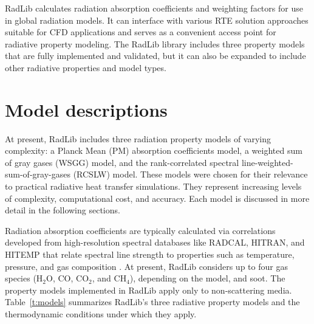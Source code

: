 \documentclass[preprint,12pt]{elsarticle}
\begin{document}
RadLib calculates radiation absorption coefficients and weighting factors for use in global radiation models. It can interface with various RTE solution approaches suitable for CFD applications and serves as a convenient access point for radiative property modeling. The RadLib library includes three property models that are fully implemented and validated, but it can also be expanded to include other radiative properties and model types.


\section{Model descriptions} \label{s:models}

At present, RadLib includes three radiation property models of varying complexity: a Planck Mean (PM) absorption coefficients model, a weighted sum of gray gases (WSGG) model, and the rank-correlated spectral line-weighted-sum-of-gray-gases (RCSLW) model.
These models were chosen for their relevance to practical radiative heat transfer simulations. They represent increasing levels of complexity, computational cost, and accuracy. Each model is discussed in more detail in the following sections.

Radiation absorption coefficients are typically calculated via correlations developed from high-resolution spectral databases like RADCAL, HITRAN, and HITEMP \citep{Grosshandler_1993,Rothman_2010} that relate spectral line strength to properties such as temperature, pressure, and gas composition \citep{Zhang_2002b}. At present, RadLib considers up to four gas species (H$_2$O, CO, CO$_2$, and CH$_4$), depending on the model, and soot. The property models implemented in RadLib apply only to non-scattering media. Table~\ref{t:models} summarizes RadLib's three radiative property models and the thermodynamic conditions under which they apply.

\begin{table}
    \caption{Summary of radiative property models and ranges of applicability. For the WSGG model the pressure range is given in terms of the pressure-path length product.}
\label{t:models}
\centering
{}
\end{table}
\end{document}
